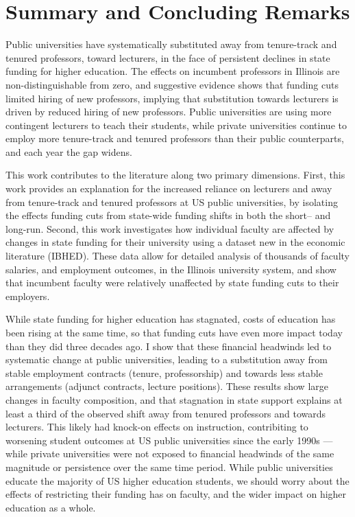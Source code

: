\section{Summary and Concluding Remarks}
\label{sec:conclusion}
Public universities have systematically substituted away from tenure-track and tenured professors, toward lecturers, in the face of persistent declines in state funding for higher education.
The effects on incumbent professors in Illinois are non-distinguishable from zero, and suggestive evidence shows that funding cuts limited hiring of new professors, implying that substitution towards lecturers is driven by reduced hiring of new professors.
Public universities are using more contingent lecturers to teach their students, while private universities continue to employ more tenure-track and tenured professors than their public counterparts, and each year the gap widens.

This work contributes to the literature along two primary dimensions.
First, this work provides an explanation for the increased reliance on lecturers and away from tenure-track and tenured professors at US public universities, by isolating the effects funding cuts from state-wide funding shifts in both the short-- and long-run.
Second, this work investigates how individual faculty are affected by changes in state funding for their university using a dataset new in the economic literature (IBHED).
These data allow for detailed analysis of thousands of faculty salaries, and employment outcomes, in the Illinois university system, and show that incumbent faculty were relatively unaffected by state funding cuts to their employers.

While state funding for higher education has stagnated, costs of education has been rising at the same time, so that funding cuts have even more impact today than they did three decades ago.
I show that these financial headwinds led to systematic change at public universities, leading to a substitution away from stable employment contracts (tenure, professorship) and towards less stable arrangements (adjunct contracts, lecture positions).
These results show large changes in faculty composition, and that stagnation in state support explains at least a third of the observed shift away from tenured professors and towards lecturers.
This likely had knock-on effects on instruction, contribiting to worsening student outcomes at US public universities since the early 1990s --- while private universities were not exposed to financial headwinds of the same magnitude or persistence over the same time period.
While public universities educate the majority of US higher education students, we should worry about the effects of restricting their funding has on faculty, and the wider impact on higher education as a whole.
